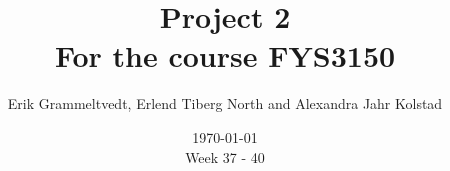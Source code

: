 \documentclass{article}
\begin{document}
\addtocounter{page}{0}

\title{Project 2 \\
      \large For the course FYS3150}
\date{\today \\
    \vspace{1mm}
    \large Week 37 - 40}

\author{Erik Grammeltvedt, Erlend Tiberg North and Alexandra Jahr Kolstad}

\maketitle

\vspace{1cm}

\tableofcontents

\vspace{1cm}
\end{document}
